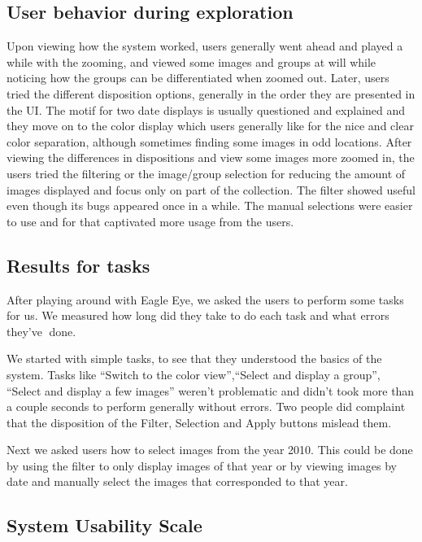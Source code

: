 \subsection{User behavior during exploration}

Upon viewing how the system worked, users generally went ahead and played a while with the zooming, and viewed some images and groups at will while noticing how the groups can be differentiated when zoomed out. Later, users tried the different disposition options, generally in the order they are presented in the \ac{UI}. The motif for two date displays is usually questioned and explained and they move on to the color display which users generally like for the nice and clear color separation, although sometimes finding some images in odd locations. After viewing the differences in dispositions and view some images more zoomed in, the users tried the filtering or the image/group selection for reducing the amount of images displayed and focus only on part of the collection. The filter showed useful even though its bugs appeared once in a while. The manual selections were easier to use and for that captivated more usage from the users.


\subsection{Results for tasks}

After playing around with Eagle Eye, we asked the users to perform some tasks for us. We measured how long did they take to do each task and what errors they've done.

We started with simple tasks, to see that they understood the basics of the system. Tasks like ``Switch to the color view'',``Select and display a group'', ``Select and display a few images'' weren't problematic and didn't took more than a couple seconds to perform generally without errors. Two people did complaint that the disposition of the Filter, Selection and Apply buttons mislead them.

Next we asked users how to select images from the year 2010. This could be done by using the filter to only display images of that year or by viewing images by date and manually select the images that corresponded to that year.





\subsection{System Usability Scale}

